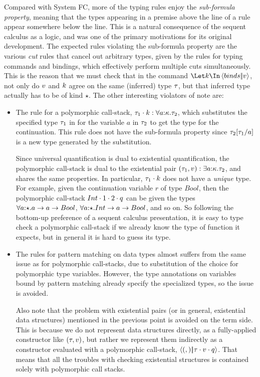 \documentclass{article}
\begin{document}
Compared with System FC, more of the typing rules enjoy the
\emph{sub-formula property}, meaning that the types appearing in a premise above
the line of a rule appear somewhere below the line.  This is a natural
consequence of the sequent calculus as a logic, and was one of the primary
motivations for its original development.  The expected rules violating the
sub-formula property are the various \emph{cut} rules that cancel out arbitrary
types, given by the rules for typing commands and bindings, which effectively
perform multiple cuts simultaneously.  This is the reason that we must check
that in the command $\mcut{\binds}{\tm}{\ko}$, not only do $v$ and $k$ agree
on the same (inferred) type $\tau$, but that inferred type actually has to be of
kind $\star$.  The other interesting violators of note are:
\begin{itemize}
\item The rule for a polymorphic call-stack,
  ${\tau_1}\cdot{k} : \forall a{:}{\kappa}.\tau_2$, which substitutes the
  specified type $\tau_1$ in for the variable $a$ in $\tau_2$ to get the type for
  the continuation.  This rule does not have the sub-formula property since
  $\tau_2[\tau_1/a]$ is a new type generated by the substitution.

  Since universal quantification is dual to existential quantification, the
  polymorphic call-stack is dual to the existential pair
  $(\tau_1,v) : \exists a{:}{\kappa}.\tau_2$, and shares the same properties.
  In particular, ${\tau_1}\cdot{k}$ does not have a \emph{unique} type.  For
  example, given the continuation variable $r$ of type $Bool$, then the
  polymorphic call-stack ${Int}\cdot{{1}\cdot{{2}\cdot{q}}}$ can be given the types
  $\forall a{:}{\star}. a \to a \to Bool$,
  $\forall a{:}{\star}. Int \to a \to Bool$, and so on.  So following the
  bottom-up preference of a sequent calculus presentation, it is easy to type
  check a polymorphic call-stack if we already know the type of function it
  expects, but in general it is hard to guess its type.

\item The rules for pattern matching on data types almost suffers from the same
  issue as for polymorphic call-stacks, due to substitution of the choice for
  polymorphic type variables.  However, the type annotations on variables bound
  by pattern matching already specify the specialized types, so the issue is
  avoided.

  Also note that the problem with existential pairs (or in general, existential
  data structures) mentioned in the previous point is avoided on the term side.
  This is because we do not represent data structures directly, as a
  fully-applied constructor like $(\tau, v)$, but rather we represent them
  indirectly as a constructor evaluated with a polymorphic call-stack,
  $\left\langle{(,)}\middle|\!\middle|{{\tau}\cdot{{v}\cdot{q}}}\right\rangle$.  That means that all the troubles with
  checking existential structures is contained solely with polymorphic call
  stacks.


\end{itemize}
\end{document}
